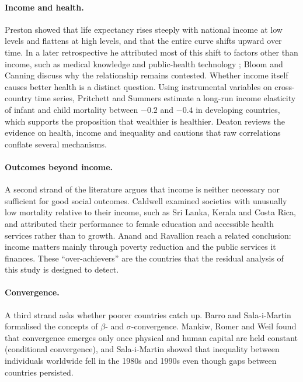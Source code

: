 \documentclass[11pt,a4paper]{article}
\begin{document}
\paragraph{Income and health.} Preston \cite{preston} showed that life expectancy rises steeply with national income at low levels and flattens at high levels, and that the entire curve shifts upward over time. In a later retrospective he attributed most of this shift to factors other than income, such as medical knowledge and public-health technology \cite{preston07}; Bloom and Canning \cite{bloom07} discuss why the relationship remains contested. Whether income itself causes better health is a distinct question. Using instrumental variables on cross-country time series, Pritchett and Summers \cite{pritchett} estimate a long-run income elasticity of infant and child mortality between $-0.2$ and $-0.4$ in developing countries, which supports the proposition that wealthier is healthier. Deaton \cite{deaton} reviews the evidence on health, income and inequality and cautions that raw correlations conflate several mechanisms.

\paragraph{Outcomes beyond income.} A second strand of the literature argues that income is neither necessary nor sufficient for good social outcomes. Caldwell \cite{caldwell} examined societies with unusually low mortality relative to their income, such as Sri Lanka, Kerala and Costa Rica, and attributed their performance to female education and accessible health services rather than to growth. Anand and Ravallion \cite{anand} reach a related conclusion: income matters mainly through poverty reduction and the public services it finances. These ``over-achievers'' are the countries that the residual analysis of this study is designed to detect.

\paragraph{Convergence.} A third strand asks whether poorer countries catch up. Barro and Sala-i-Martin \cite{barro} formalised the concepts of $\beta$- and $\sigma$-convergence. Mankiw, Romer and Weil \cite{mrw} found that convergence emerges only once physical and human capital are held constant (conditional convergence), and Sala-i-Martin \cite{sala06} showed that inequality between individuals worldwide fell in the 1980s and 1990s even though gaps between countries persisted.
\end{document}
